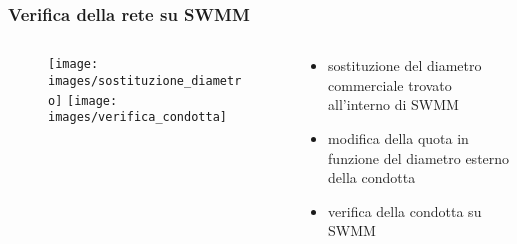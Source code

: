 \documentclass{beamer}
\begin{document}
\begin{frame}
 \frametitle{Verifica della rete su SWMM}
 
 \begin{columns}
  \begin{column}{.5\textwidth}
  \begin{figure}
   \centering
   \begin{overprint}
     \texttt{[image: images/sostituzione\_diametro]}
     \texttt{[image: images/verifica\_condotta]}
   \end{overprint}
  \end{figure}   
  \end{column}
  
  \begin{column}{.5\textwidth}
   \begin{itemize}
    \item sostituzione del diametro commerciale trovato all'interno di SWMM
   \item modifica della quota in funzione del diametro esterno della condotta
    \item verifica della condotta su SWMM   
   \end{itemize}
  \end{column}
 \end{columns}
\end{frame}
\end{document}
